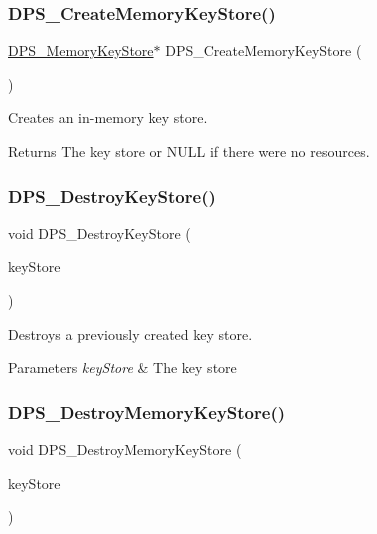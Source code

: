 \subsubsection{\texorpdfstring{D\+P\+S\+\_\+\+Create\+Memory\+Key\+Store()}{DPS\_CreateMemoryKeyStore()}}
{\footnotesize\ttfamily \hyperlink{group__keystore_ga57f11410b3ef6a686594b60836dc8c99}{D\+P\+S\+\_\+\+Memory\+Key\+Store}$\ast$ D\+P\+S\+\_\+\+Create\+Memory\+Key\+Store (\begin{DoxyParamCaption}{ }\end{DoxyParamCaption})}



Creates an in-\/memory key store. 

\begin{DoxyReturn}{Returns}
The key store or N\+U\+LL if there were no resources. 
\end{DoxyReturn}
\mbox{\label{group__keystore_ga40bea030ef0ba65ec332880ae2bbfee1}} 
\subsubsection{\texorpdfstring{D\+P\+S\+\_\+\+Destroy\+Key\+Store()}{DPS\_DestroyKeyStore()}}
{\footnotesize\ttfamily void D\+P\+S\+\_\+\+Destroy\+Key\+Store (\begin{DoxyParamCaption}\item[{\hyperlink{group__keystore_gaf3833cfe48f848f698514bc5daa075fa}{D\+P\+S\+\_\+\+Key\+Store} $\ast$}]{key\+Store }\end{DoxyParamCaption})}



Destroys a previously created key store. 


\begin{DoxyParams}{Parameters}
{\em key\+Store} & The key store \\
\hline
\end{DoxyParams}
\mbox{\label{group__keystore_ga2f9f4aeff872ca74d5735a8727f4dbae}} 
\subsubsection{\texorpdfstring{D\+P\+S\+\_\+\+Destroy\+Memory\+Key\+Store()}{DPS\_DestroyMemoryKeyStore()}}
{\footnotesize\ttfamily void D\+P\+S\+\_\+\+Destroy\+Memory\+Key\+Store (\begin{DoxyParamCaption}\item[{\hyperlink{group__keystore_ga57f11410b3ef6a686594b60836dc8c99}{D\+P\+S\+\_\+\+Memory\+Key\+Store} $\ast$}]{key\+Store }\end{DoxyParamCaption})}




